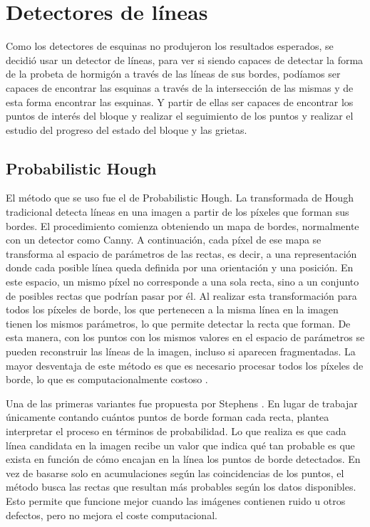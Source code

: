 \section{Detectores de líneas}
Como los detectores de esquinas no produjeron los resultados esperados, se decidió usar un detector de líneas, para ver si siendo capaces de detectar la forma de la probeta de hormigón a través de las líneas de sus bordes, podíamos ser capaces de encontrar las esquinas a través de la intersección de las mismas y de esta forma encontrar las esquinas. Y partir de ellas ser capaces de encontrar los puntos de interés del bloque y realizar el seguimiento de los puntos y realizar el estudio del progreso del estado del bloque y las grietas.

\subsection{Probabilistic Hough}
El método que se uso fue el de Probabilistic Hough. La transformada de Hough tradicional detecta líneas en una imagen a partir de los píxeles que forman sus bordes. El procedimiento comienza obteniendo un mapa de bordes, normalmente con un detector como Canny. A continuación, cada píxel de ese mapa se transforma al espacio de parámetros de las rectas, es decir, a una representación donde cada posible línea queda definida por una orientación y una posición. En este espacio, un mismo píxel no corresponde a una sola recta, sino a un conjunto de posibles rectas que podrían pasar por él. Al realizar esta transformación para todos los píxeles de borde, los que pertenecen a la misma línea en la imagen tienen los mismos parámetros, lo que permite detectar la recta que forman. De esta manera, con los puntos con los mismos valores en el espacio de parámetros se pueden reconstruir las líneas de la imagen, incluso si aparecen fragmentadas. La mayor desventaja de este método es que es necesario procesar todos los píxeles de borde, lo que es computacionalmente costoso \cite{duda1972hough}.

Una de las primeras variantes fue propuesta por Stephens \cite{stephens1991pht}. En lugar de trabajar únicamente contando cuántos puntos de borde forman cada recta, plantea interpretar el proceso en términos de probabilidad. Lo que realiza es que cada línea candidata en la imagen recibe un valor que indica qué tan probable es que exista en función de cómo encajan en la línea los puntos de borde detectados. En vez de basarse solo en acumulaciones según las coincidencias de los puntos, el método busca las rectas que resultan más probables según los datos disponibles. Esto permite que funcione mejor cuando las imágenes contienen ruido u otros defectos, pero no mejora el coste computacional.

